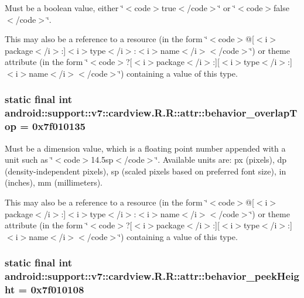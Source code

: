 Must be a boolean value, either \char`\"{}$<$code$>$true$<$/code$>$\char`\"{} or \char`\"{}$<$code$>$false$<$/code$>$\char`\"{}. 

This may also be a reference to a resource (in the form \char`\"{}$<$code$>$@\mbox{[}$<$i$>$package$<$/i$>$:\mbox{]}$<$i$>$type$<$/i$>$:$<$i$>$name$<$/i$>$$<$/code$>$\char`\"{}) or theme attribute (in the form \char`\"{}$<$code$>$?\mbox{[}$<$i$>$package$<$/i$>$:\mbox{]}\mbox{[}$<$i$>$type$<$/i$>$:\mbox{]}$<$i$>$name$<$/i$>$$<$/code$>$\char`\"{}) containing a value of this type. \hypertarget{classandroid_1_1support_1_1v7_1_1cardview_1_1_r_1_1attr_90cb4ddab235f8a249b77e63cdd1216f}{
\subsubsection[{behavior\_\-overlapTop}]{\setlength{\rightskip}{0pt plus 5cm}static final int android::support::v7::cardview.R.R::attr::behavior\_\-overlapTop = 0x7f010135}}
\label{classandroid_1_1support_1_1v7_1_1cardview_1_1_r_1_1attr_90cb4ddab235f8a249b77e63cdd1216f}


Must be a dimension value, which is a floating point number appended with a unit such as \char`\"{}$<$code$>$14.5sp$<$/code$>$\char`\"{}. Available units are: px (pixels), dp (density-independent pixels), sp (scaled pixels based on preferred font size), in (inches), mm (millimeters). 

This may also be a reference to a resource (in the form \char`\"{}$<$code$>$@\mbox{[}$<$i$>$package$<$/i$>$:\mbox{]}$<$i$>$type$<$/i$>$:$<$i$>$name$<$/i$>$$<$/code$>$\char`\"{}) or theme attribute (in the form \char`\"{}$<$code$>$?\mbox{[}$<$i$>$package$<$/i$>$:\mbox{]}\mbox{[}$<$i$>$type$<$/i$>$:\mbox{]}$<$i$>$name$<$/i$>$$<$/code$>$\char`\"{}) containing a value of this type. \hypertarget{classandroid_1_1support_1_1v7_1_1cardview_1_1_r_1_1attr_22ed8c43a4e58b9b41c57f2e092e00dc}{
\subsubsection[{behavior\_\-peekHeight}]{\setlength{\rightskip}{0pt plus 5cm}static final int android::support::v7::cardview.R.R::attr::behavior\_\-peekHeight = 0x7f010108}}
\label{classandroid_1_1support_1_1v7_1_1cardview_1_1_r_1_1attr_22ed8c43a4e58b9b41c57f2e092e00dc}


